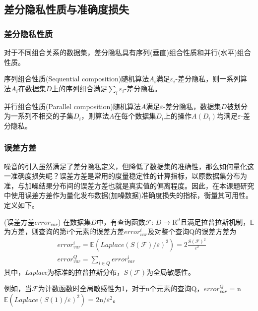 \subsection{差分隐私性质与准确度损失}

\subsubsection{差分隐私性质}
对于不同组合关系的数据集，差分隐私具有序列(垂直)组合性质和并行(水平)组合性质。

\begin{lem}
	序列组合性质(Sequential composition)\supercite{composition}随机算法$A_{i}$满足$\varepsilon_{i}$-差分隐私，则一系列算法$A_{i}$在数据集$D$上的序列组合满足$\sum\limits_i \varepsilon_{i}$-差分隐私。
\end{lem}

\begin{lem}
	\label{parallel}
	并行组合性质(Parallel composition)\supercite{composition}随机算法$A$满足$\varepsilon$-差分隐私，数据集$D$被划分为一系列不相交的子集$D_{i}$，则算法$A$在每个数据集$D_{i}$上的操作$A(D_{i})$均满足$\varepsilon$-差分隐私。
\end{lem}

\subsubsection{误差方差}
噪音的引入虽然满足了差分隐私定义，但降低了数据集的准确性，那么如何量化这一准确度损失呢？误差方差是常用的度量稳定性的计算指标，以原数据集分布为准，与加噪结果分布间的误差方差也就是真实值的偏离程度。因此，在本课题研究中使用误差方差作为量化发布数据(加噪数据)准确度损失的指标，衡量其可用性。
定义如下。
\begin{defn}
	\label{thm:error}
	(\textsc{误差方差}$error_{var}$\supercite{Dwork Calibrating}) 在数据集$D$中，有查询函数$\mathcal{F}$: $D\rightarrow \mathrm{R}^d$且满足拉普拉斯机制，$\mathbb{E}$为方差，则查询的第i个元素的误差方差$error_{var}^{i}$及对整个查询Q的误差方差为
	\begin{eqnarray}
	&error_{var}^{i} = \mathbb{E}(\textit{Laplace}(S(\mathcal{F})/ \varepsilon)^2) = 2\frac{S(\mathcal{F})^2}{\varepsilon^2}\\
	&error_{var}^{Q} = \sum\nolimits_{i \in Q}error_{var}^{i}
	\end{eqnarray}
	其中，\textit{Laplace}为标准的拉普拉斯分布，$S(\mathcal{F})$为全局敏感性。
\end{defn}

例如，当$\mathcal{F}$为计数函数时全局敏感性为1，对于n个元素的查询Q，$error_{var}^{Q}$ = n$\mathbb{E}(\textit{Laplace}(S(1)/ \varepsilon)^2)$ = 2n/$\varepsilon^2$。

